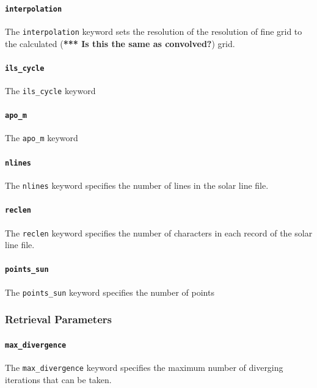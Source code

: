 \documentclass{article}
\begin{document}
\paragraph{\texttt{interpolation}}

The \texttt{interpolation} keyword sets the resolution of the
resolution of fine grid to the calculated (\textbf{*** Is this the same
as convolved?}) grid.

\paragraph{\texttt{ils\_cycle}}

The \texttt{ils\_cycle} keyword

\paragraph{\texttt{apo\_m}}

The \texttt{apo\_m} keyword

\paragraph{\texttt{nlines}}

The \texttt{nlines} keyword specifies the number of lines in the solar
line file.

\paragraph{\texttt{reclen}}

The \texttt{reclen} keyword specifies the number of characters in each
record of the solar line file.

\paragraph{\texttt{points\_sun}}

The \texttt{points\_sun} keyword specifies the number of points 

\subsubsection{Retrieval Parameters}

\paragraph{\texttt{max\_divergence}}

The \texttt{max\_divergence} keyword specifies the maximum number of
diverging iterations that can be taken.
\end{document}
